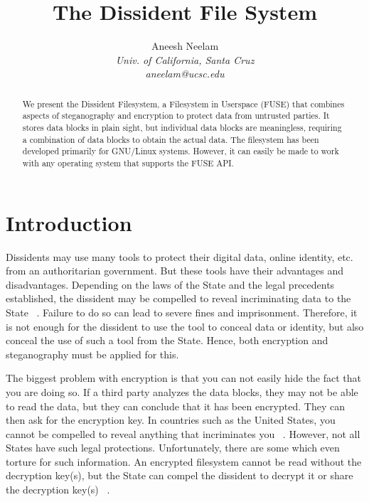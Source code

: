 \documentclass[10pt,twocolumn]{article}
\begin{document}
\title{The Dissident File System}

\author{
Aneesh Neelam \\
\textit{Univ. of California, Santa Cruz} \\
\textit{aneelam@ucsc.edu}
}

\maketitle
\thispagestyle{empty}

\begin{abstract}
We present the Dissident Filesystem, a Filesystem in Userspace (FUSE) that combines aspects of steganography and encryption to protect data from untrusted parties. It stores data blocks in plain sight, but individual data blocks are meaningless, requiring a combination of data blocks to obtain the actual data. The filesystem has been developed primarily for GNU/Linux systems. However, it can easily be made to work with any operating system that supports the FUSE API. 
\end{abstract}

\section{Introduction}

Dissidents may use many tools to protect their digital data, online identity, etc. from an authoritarian government. But these tools have their advantages and disadvantages. Depending on the laws of the State and the legal precedents established, the dissident may be compelled to reveal incriminating data to the State ~\cite{ex2}. Failure to do so can lead to severe fines and imprisonment.  Therefore, it is not enough for the dissident to use the tool to conceal data or identity, but also conceal the use of such a tool from the State. Hence, both encryption and steganography must be applied for this. 

The biggest problem with encryption is that you can not easily hide the fact that you are doing so. If a third party analyzes the data blocks, they may not be able to read the data, but they can conclude that it has been encrypted. They can then ask for the encryption key. In countries such as the United States, you cannot be compelled to reveal anything that incriminates you ~\cite{ex12}. However, not all States have such legal protections.  Unfortunately, there are some which even torture for such information. An encrypted filesystem cannot be read without the decryption key(s), but the State can compel the dissident to decrypt it or share the decryption key(s) ~\cite{ex2,ex10}. 
\end{document}
